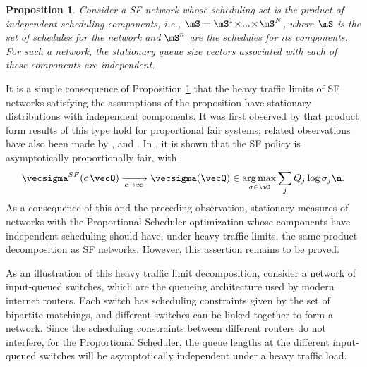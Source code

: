 \documentclass{amsart}
\newtheorem{proposition}{Proposition}
\begin{document}
\begin{proposition}\label{PFRPProp}
Consider a SF network whose scheduling set is the product of independent scheduling components, i.e.,  $\mS= \mS^1\! \times\! ...\! \times\! \mS^N$, where $\mS$ is the set of schedules for the network and $\mS^n$ are the schedules for its components.  For such a network, the stationary queue size vectors associated with each of these components  are independent.
\end{proposition}
\iffalse
The proof of the above proposition interprets the scheduling set $\coS$  as  a polytope with a finite number of facets:
\[
\coS=\left \{ \sigma\in \bR_+^\mJ : \sum_{j\in\mJ} A_{lj} \sigma_j \leq 1,\, l\in\mL \right\}.
\]
Here, the set $\mL$ indexes the facets or \emph{resource pools} of the scheduling polytope $\coS$ and $A=(A_{lj}: l\in\mL, j\in\mJ)$ is a non-negative matrix. As was first observed by \cite{KKLW07i}, for proportional fair systems, there is an independent random variable associated with each facet of the above polytope and the queue sizes can be determined as a linear function of these. When the scheduling polytope is of product form, i.e., $\mS= \mS_1\! \times\! ...\! \times\! \mS_N$, then the queue sizes in different components are linear combinations of different independent random variables and so are themselves independent.
\fi

It is a simple consequence of Proposition \ref{PFRPProp} that the
heavy traffic limits of SF networks satisfying the assumptions of the proposition have stationary distributions with independent components.
It was first observed by \cite{KKLW07i} that product form results of this type hold for proportional fair systems;
related observations have also been made by \cite{Sc79,Ke89}, and \cite{MaRo99}.
In  \cite{Wa09}, it is shown that the SF policy is asymptotically proportionally fair, with
\begin{equation}\label{LimSF}
\vecsigma^{SF}(c \, \vecQ) \xrightarrow[c\rightarrow\infty]{} \vecsigma(\vecQ) \in \operatorname*{arg\,max}_{\sigma\in\mC} \sum_j Q_j \log \sigma_j \n .
\end{equation}
As a consequence of this and the preceding observation, stationary measures of networks with the Proportional Scheduler optimization whose components have independent scheduling should have, under heavy traffic limits, the same product decomposition as SF networks.  However, this assertion remains to be proved.

As an illustration of this heavy traffic limit decomposition, consider  a network of input-queued switches, which are the queueing architecture used by modern internet routers. Each switch has scheduling constraints given by the set of bipartite matchings, and different switches can be linked together to form a network. Since the scheduling constraints between different routers do not interfere, for the Proportional Scheduler, the queue lengths at the different input-queued switches will be asymptotically independent under a heavy traffic load.
\end{document}
